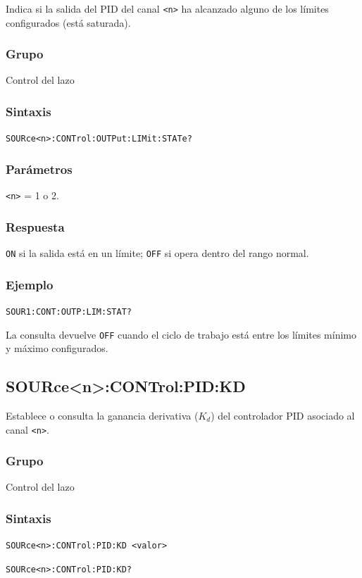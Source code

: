Indica si la salida del PID del canal \texttt{<n>} ha alcanzado alguno de
los límites configurados (está saturada).

\subsubsection*{Grupo}
Control del lazo

\subsubsection*{Sintaxis}
\texttt{SOURce<n>:CONTrol:OUTPut:LIMit:STATe?}

\subsubsection*{Parámetros}
\texttt{<n>} = 1 o 2.

\subsubsection*{Respuesta}
\texttt{ON} si la salida está en un límite; \texttt{OFF} si opera dentro
del rango normal.

\subsubsection*{Ejemplo}
\texttt{SOUR1:CONT:OUTP:LIM:STAT?}

La consulta devuelve \texttt{OFF} cuando el ciclo de trabajo está entre los
límites mínimo y máximo configurados.

\subsection*{SOURce<n>:CONTrol:PID:KD}

Establece o consulta la ganancia derivativa ($K_d$) del controlador PID
asociado al canal \texttt{<n>}.

\subsubsection*{Grupo}
Control del lazo

\subsubsection*{Sintaxis}
\texttt{SOURce<n>:CONTrol:PID:KD <valor>}\par
\texttt{SOURce<n>:CONTrol:PID:KD?}

